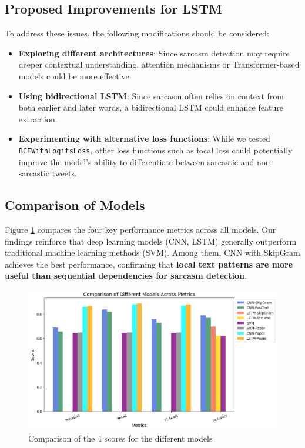 \documentclass[11pt]{article}
\begin{document}
\subsection{Proposed Improvements for LSTM}
To address these issues, the following modifications should be considered:
\begin{itemize}
    \item \textbf{Exploring different architectures}: Since sarcasm detection may require deeper contextual understanding, attention mechanisms or Transformer-based models could be more effective.
    \item \textbf{Using bidirectional LSTM}: Since sarcasm often relies on context from both earlier and later words, a bidirectional LSTM could enhance feature extraction.
    \item \textbf{Experimenting with alternative loss functions}: While we tested \texttt{BCEWithLogitsLoss}, other loss functions such as focal loss could potentially improve the model’s ability to differentiate between sarcastic and non-sarcastic tweets.
\end{itemize}


\subsection{Comparison of Models}
Figure \ref{fig:comp} compares the four key performance metrics across all models. Our findings reinforce that deep learning models (CNN, LSTM) generally outperform traditional machine learning methods (SVM). Among them, CNN with SkipGram achieves the best performance, confirming that \textbf{local text patterns are more useful than sequential dependencies for sarcasm detection}.

\begin{figure}[htbp]
    \centering
    \includegraphics[width=\linewidth]{pic/Comparison.png}
    \caption{Comparison of the 4 scores for the different models}
    \label{fig:comp}
\end{figure}
\end{document}
